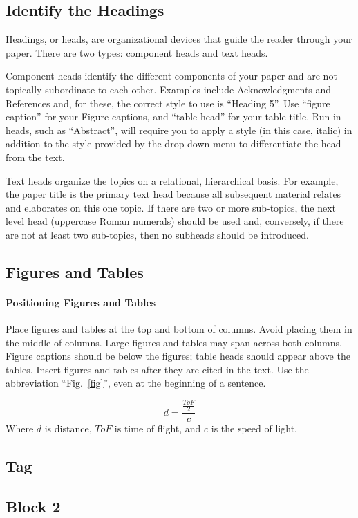 \documentclass[conference]{IEEEtran}
\begin{document}
\subsection{Identify the Headings}
Headings, or heads, are organizational devices that guide the reader through 
your paper. There are two types: component heads and text heads.

Component heads identify the different components of your paper and are not 
topically subordinate to each other. Examples include Acknowledgments and 
References and, for these, the correct style to use is ``Heading 5''. Use 
``figure caption'' for your Figure captions, and ``table head'' for your 
table title. Run-in heads, such as ``Abstract'', will require you to apply a 
style (in this case, italic) in addition to the style provided by the drop 
down menu to differentiate the head from the text.

Text heads organize the topics on a relational, hierarchical basis. For 
example, the paper title is the primary text head because all subsequent 
material relates and elaborates on this one topic. If there are two or more 
sub-topics, the next level head (uppercase Roman numerals) should be used 
and, conversely, if there are not at least two sub-topics, then no subheads 
should be introduced.

\subsection{Figures and Tables}
\paragraph{Positioning Figures and Tables} Place figures and tables at the top and 
bottom of columns. Avoid placing them in the middle of columns. Large 
figures and tables may span across both columns. Figure captions should be 
below the figures; table heads should appear above the tables. Insert 
figures and tables after they are cited in the text. Use the abbreviation 
``Fig.~\ref{fig}'', even at the beginning of a sentence.

\[ d = \frac{\frac{ToF}{2}}{c} \]
Where $d$ is distance, $ToF$ is time of flight, and $c$ is the speed of light.


\subsection{Tag}

\subsection{Block 2}
\end{document}
